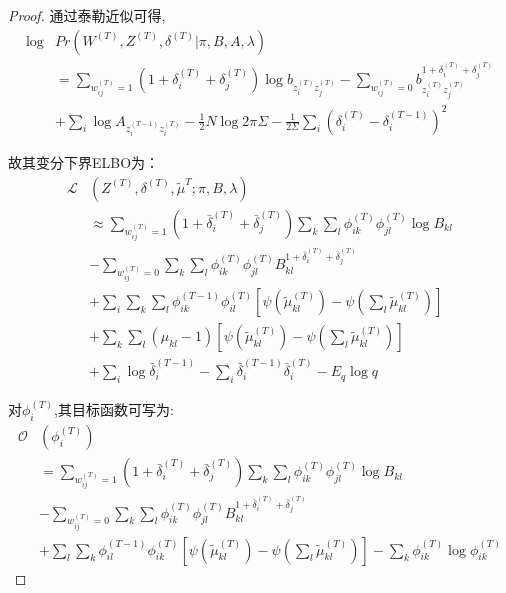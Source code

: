 \begin{proof}
	通过泰勒近似可得,
	\begin{equation}
		\begin{split}
			\log &Pr(W^{(T)},Z^{(T)},\delta^{(T)}|\pi,B,A,\lambda)  \\
			&  =\sum_{w_{ij}^{(T)}=1} (1+\delta_i^{(T)}+\delta_j^{(T)}) \log b_{z_i^{(T)} z_j^{(T)}} -\sum_{w_{ij}^{(T)}=0} b_{z_i^{(T)} z_j^{(T)}}^{1+\delta_i^{(T)}+\delta_j^{(T)}}\\
			& +\sum_{i} \log A_{z_i^{(T-1)} z_i^{(T)}}  -\frac{1}{2}N \log 2 \pi \Sigma -\frac{1}{2\Sigma} \sum_{i} (\delta_i^{(T)}-\delta_i^{(T-1)})^2
		\end{split}
	\end{equation}
	
	故其变分下界ELBO为：
	\begin{equation}
		\begin{split}
			\mathscr{L}&(Z^{(T)},\delta^{(T)},\tilde{\mu}^T;\pi,B,\lambda)  \\
			& \approx \sum_{w_{ij}^{(T)}=1} (1+\bar{\delta}_i^{(T)}+\bar{\delta}_j^{(T)}) \sum_k \sum_l \phi_{ik}^{(T)}\phi_{jl}^{(T)} \log B_{kl} \\
			& -\sum_{w_{ij}^{(T)}=0} \sum_k \sum_l \phi_{ik}^{(T)}\phi_{jl}^{(T)}  B_{kl}^{1+\bar{\delta}_i^{(T)}+\bar{\delta}_j^{(T)}} \\
			& +\sum_i \sum_k \sum_l \phi_{ik}^{(T-1)}\phi_{il}^{(T)} [\psi(\tilde{\mu}_{kl}^{(T)}) - \psi(\sum_l \tilde{\mu}_{kl}^{(T)})]  \\
			&  + \sum_k \sum_l (\mu_{kl} - 1) [\psi(\tilde{\mu}_{kl}^{(T)}) - \psi(\sum_l \tilde{\mu}_{kl}^{(T)})]   \\
			& + \sum_i \log \bar{\delta}_i^{(T-1)} - \sum_i \bar{\delta}_i^{(T-1)}\bar{\delta}_i^{(T)}  - E_q \log q
		\end{split}
	\end{equation}
	
	对$\phi_i^{(T)}$,其目标函数可写为:
	\begin{equation}
		\begin{split}
			\mathscr{O}&(\phi_i^{(T)})  \\
			& = \sum_{w_{ij}^{(T)}=1} (1+\bar{\delta}_i^{(T)}+\bar{\delta}_j^{(T)}) \sum_k \sum_l \phi_{ik}^{(T)}\phi_{jl}^{(T)} \log B_{kl} \\
			& -\sum_{w_{ij}^{(T)}=0} \sum_k \sum_l \phi_{ik}^{(T)}\phi_{jl}^{(T)}  B_{kl}^{1+\bar{\delta}_i^{(T)}+\bar{\delta}_j^{(T)}} \\
			& + \sum_l \sum_k \phi_{il}^{(T-1)}\phi_{ik}^{(T)} [\psi(\tilde{\mu}_{kl}^{(T)}) - \psi(\sum_l \tilde{\mu}_{kl}^{(T)})]  -\sum_k \phi_{ik}^{(T)} \log \phi_{ik}^{(T)}
		\end{split}
	\end{equation}
	

\end{proof}

